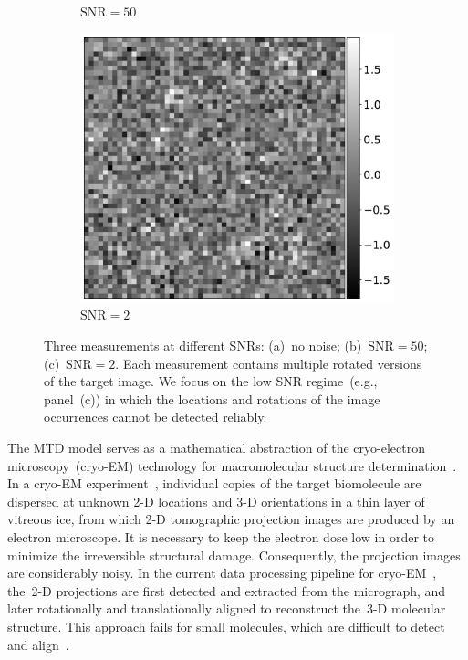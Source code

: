 \documentclass{article}
\begin{document}
\begin{figure}[!tb]
\begin{subfigure}[ht]{0.30\columnwidth}
		\caption{$\text{SNR} = 50$}
	\end{subfigure}
	\hfill
	\begin{subfigure}[ht]{0.30\columnwidth}
		\centering
		\includegraphics[width=\columnwidth]{figures/Micrographs_noise_b.pdf}
		\caption{$\text{SNR} = 2$}
	\end{subfigure}
	\caption{Three measurements at different SNRs: (a)~no noise; (b)~\mbox{$\text{SNR} = 50$}; (c)~\mbox{$\text{SNR} = 2$}. Each measurement contains multiple rotated versions of the target image. We focus on the low SNR regime~{(e.g., panel~(c))} in which the locations and rotations of the image occurrences cannot be detected reliably.}
\label{fig:Micrographs_noise}
\end{figure}

The MTD model serves as a mathematical abstraction of the cryo-electron microscopy~(\mbox{cryo-EM}) technology for macromolecular structure determination~\cite{henderson1995potential, nogales2016development, bai2015cryo}. In a \mbox{cryo-EM} experiment~\cite{frank2006three}, individual copies of the target biomolecule are dispersed at unknown \mbox{2-D} locations and \mbox{3-D} orientations in a thin layer of vitreous ice, from which \mbox{2-D} tomographic projection images are produced by an electron microscope. It is necessary to keep the electron dose low in order to minimize the irreversible structural damage. Consequently, the projection images are considerably noisy. In the current data processing pipeline for \mbox{cryo-EM}~\cite{bendory2020single, singer2020computational, scheres2012relion, punjani2017cryosparc}, the~\mbox{2-D} projections are first detected and extracted from the micrograph, and later rotationally and translationally aligned to reconstruct the~\mbox{3-D} molecular structure. This approach fails for small molecules, which are difficult to detect and align~\cite{bendory2018toward, henderson1995potential, bendory2020single, aguerrebere2016fundamental}.
\end{document}
